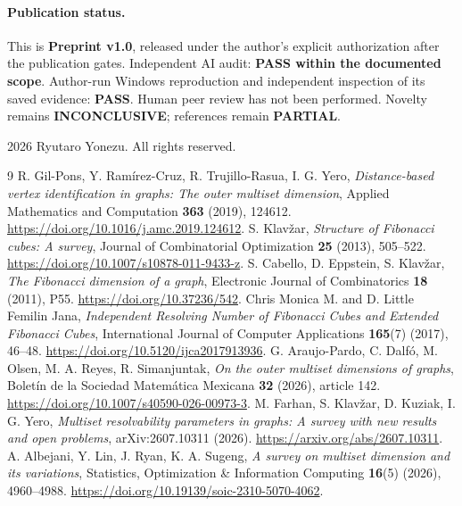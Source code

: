 \documentclass[10pt,a4paper]{article}
\begin{document}
\paragraph{Publication status.} This is \textbf{Preprint v1.0}, released under the
author's explicit authorization after the publication gates. Independent AI audit:
\textbf{PASS within the documented scope}. Author-run Windows reproduction and independent
inspection of its saved evidence: \textbf{PASS}. Human peer review has not been performed.
Novelty remains \textbf{INCONCLUSIVE}; references remain \textbf{PARTIAL}.

\vspace{1em}
\noindent\textcopyright{} 2026 Ryutaro Yonezu. All rights reserved.

\begin{thebibliography}{9}\setlength{\itemsep}{2pt}
 R. Gil-Pons, Y. Ram\'irez-Cruz, R. Trujillo-Rasua, I. G. Yero,
\emph{Distance-based vertex identification in graphs: The outer multiset dimension},
Applied Mathematics and Computation \textbf{363} (2019), 124612.
\url{https://doi.org/10.1016/j.amc.2019.124612}.
 S. Klav\v{z}ar,
\emph{Structure of Fibonacci cubes: A survey},
Journal of Combinatorial Optimization \textbf{25} (2013), 505--522.
\url{https://doi.org/10.1007/s10878-011-9433-z}.
 S. Cabello, D. Eppstein, S. Klav\v{z}ar,
\emph{The Fibonacci dimension of a graph},
Electronic Journal of Combinatorics \textbf{18} (2011), P55.
\url{https://doi.org/10.37236/542}.
 Chris Monica M. and D. Little Femilin Jana,
\emph{Independent Resolving Number of Fibonacci Cubes and Extended Fibonacci Cubes},
International Journal of Computer Applications \textbf{165}(7) (2017), 46--48.
\url{https://doi.org/10.5120/ijca2017913936}.
 G. Araujo-Pardo, C. Dalf\'o, M. Olsen, M. A. Reyes, R. Simanjuntak,
\emph{On the outer multiset dimensions of graphs},
Bolet\'in de la Sociedad Matem\'atica Mexicana \textbf{32} (2026), article 142.
\url{https://doi.org/10.1007/s40590-026-00973-3}.
 M. Farhan, S. Klav\v{z}ar, D. Kuziak, I. G. Yero,
\emph{Multiset resolvability parameters in graphs: A survey with new results and open problems},
arXiv:2607.10311 (2026). \url{https://arxiv.org/abs/2607.10311}.
 A. Albejani, Y. Lin, J. Ryan, K. A. Sugeng,
\emph{A survey on multiset dimension and its variations},
Statistics, Optimization \& Information Computing \textbf{16}(5) (2026), 4960--4988.
\url{https://doi.org/10.19139/soic-2310-5070-4062}.
\end{thebibliography}
\end{document}
